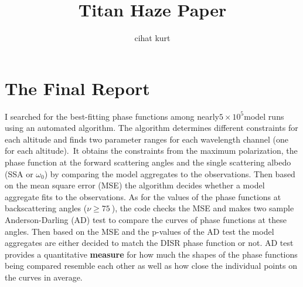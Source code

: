 \documentclass[final,5p,times,twocolumn]{elsarticle}
\begin{document}
\begin{frontmatter}



\title{Titan Haze Paper}%


\author[add1]{cihat kurt}%
\address[add1]{Texas A\&M University}%





\end{frontmatter}
\linenumbers

\section*{The Final Report}

{\label{the-final-report}}

I searched for the best-fitting phase functions among
nearly\(5\times 10^{5}\)model runs using an automated algorithm. The
algorithm determines different constraints for each altitude and finds
two parameter ranges for each wavelength channel (one for each
altitude).~It obtains the constraints from the maximum polarization, the
phase function at the forward scattering angles and the single
scattering albedo (SSA or \(\omega_{0}\)) by comparing the model
aggregates to the observations. Then based on the mean square error
(MSE) the algorithm decides whether a model aggregate fits to the
observations. As for the values of the phase functions at backscattering
angles (\(\nu\geq 75\ \)), the code checks the MSE and makes two
sample Anderson-Darling (AD) test to compare the curves of phase
functions at these angles. Then based on the MSE and the p-values of the
AD test the model aggregates are either decided to match the DISR phase
function or not. AD test provides a quantitative \textbf{measure} for
how much the shapes of the phase functions being compared resemble each
other as well as how close the individual points on the curves in
average.
\end{document}
